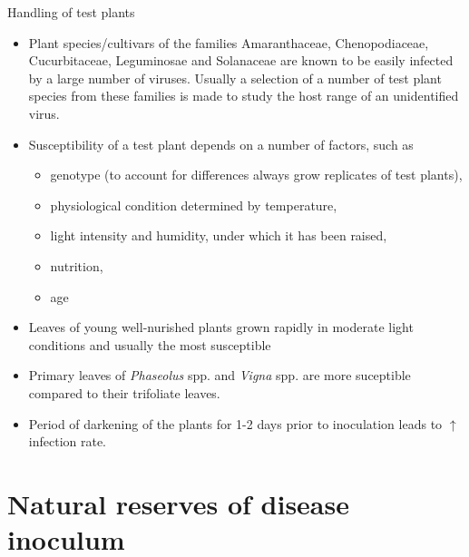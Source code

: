 \documentclass[11pt,dvipsnames,ignorenonframetext,aspectratio=169]{beamer}
\providecommand{\tightlist}{%
  \setlength{\itemsep}{0pt}\setlength{\parskip}{0pt}}
\begin{document}
\begin{frame}{Handling of test plants}
\protect\hypertarget{handling-of-test-plants}{}
\small

\begin{itemize}
\tightlist
\item
  Plant species/cultivars of the families Amaranthaceae, Chenopodiaceae,
  Cucurbitaceae, Leguminosae and Solanaceae are known to be easily
  infected by a large number of viruses. Usually a selection of a number
  of test plant species from these families is made to study the host
  range of an unidentified virus.
\item
  Susceptibility of a test plant depends on a number of factors, such as

  \begin{itemize}
  \item genotype (to account for differences always grow replicates of test plants), 
  \item physiological condition determined by temperature,
  \item light intensity and humidity, under which it has been raised,
  \item nutrition,
  \item age
  \end{itemize}
\item
  Leaves of young well-nurished plants grown rapidly in moderate light
  conditions and usually the most susceptible
\item
  Primary leaves of \emph{Phaseolus} spp. and \emph{Vigna} spp. are more
  suceptible compared to their trifoliate leaves.
\item
  Period of darkening of the plants for 1-2 days prior to inoculation
  leads to \(\uparrow\) infection rate.
\end{itemize}
\end{frame}

\hypertarget{natural-reserves-of-disease-inoculum}{%
\section{Natural reserves of disease
inoculum}\label{natural-reserves-of-disease-inoculum}}
\end{document}
